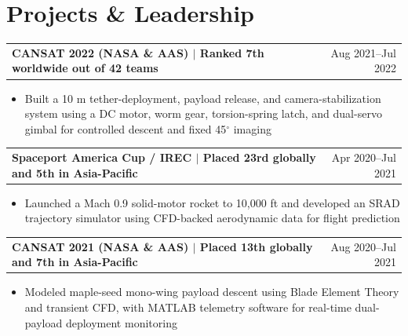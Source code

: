 \documentclass[10pt,a4paper]{article}
\makeatletter
\newcommand{\resumeProjectHeading}[2]{%
  \begin{tabular*}{\textwidth}{@{\extracolsep{\fill}}l r}
    \textbf{#1} & #2
  \end{tabular*}\vspace{-1.6pt}
}
\newcommand{\resumeItemsStart}{\begin{itemize}}
\newcommand{\resumeItemsEnd}{\end{itemize}\vspace{-1.1pt}}
\newcommand{\resumeItem}[1]{\item #1}
\makeatother
\begin{document}
\section{Projects \& Leadership}
\resumeProjectHeading{CANSAT 2022 (NASA \& AAS) $\mid$ Ranked 7th worldwide out of 42 teams}{Aug 2021--Jul 2022}
\resumeItemsStart
  \resumeItem{Built a 10 m tether-deployment, payload release, and camera-stabilization system using a DC motor, worm gear, torsion-spring latch, and dual-servo gimbal for controlled descent and fixed 45$^{\circ}$ imaging}
\resumeItemsEnd

\resumeProjectHeading{Spaceport America Cup / IREC $\mid$ Placed 23rd globally and 5th in Asia-Pacific}{Apr 2020--Jul 2021}
\resumeItemsStart
  \resumeItem{Launched a Mach 0.9 solid-motor rocket to 10,000 ft and developed an SRAD trajectory simulator using CFD-backed aerodynamic data for flight prediction}
\resumeItemsEnd

\resumeProjectHeading{CANSAT 2021 (NASA \& AAS) $\mid$ Placed 13th globally and 7th in Asia-Pacific}{Aug 2020--Jul 2021}
\resumeItemsStart
  \resumeItem{Modeled maple-seed mono-wing payload descent using Blade Element Theory and transient CFD, with MATLAB telemetry software for real-time dual-payload deployment monitoring}
\resumeItemsEnd
\end{document}
